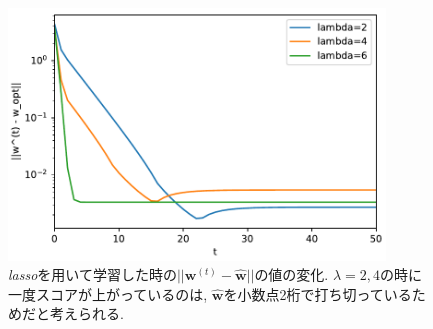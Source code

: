 \documentclass[a4paper,10pt]{jsarticle}
\begin{document}
\begin{figure}[htbp]
 \begin{center}
   \includegraphics[width=10cm]{figs/p2_lasso_dist.pdf}
 \end{center}
 \caption{\textit{lasso}を用いて学習した時の$||\bm{w}^{(t)} - \hat{\bm{w}}||$の値の変化.
 $\lambda=2,4$の時に一度スコアが上がっているのは,
 $\hat{\bm{w}}$を小数点2桁で打ち切っているためだと考えられる.}
 \label{img:lasso-error}
\end{figure}
\end{document}
